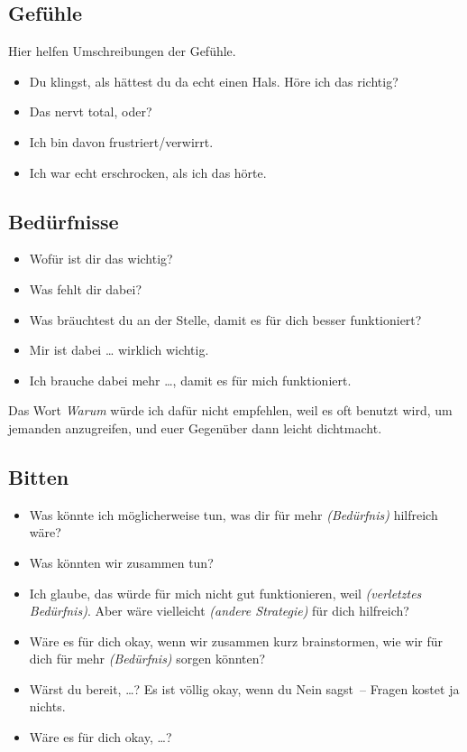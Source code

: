 \subsection{Gefühle}

Hier helfen Umschreibungen der Gefühle.

\begin{itemize}
  \item Du klingst, als hättest du da echt einen Hals. Höre ich das richtig?
  \item Das nervt total, oder?
  \item Ich bin davon frustriert/verwirrt.
  \item Ich war echt erschrocken, als ich das hörte.
\end{itemize}


\subsection{Bedürfnisse}

\begin{itemize}
  \item Wofür ist dir das wichtig?
  \item Was fehlt dir dabei?
  \item Was bräuchtest du an der Stelle, damit es für dich besser funktioniert?
  \item Mir ist dabei \ldots{} wirklich wichtig.
  \item Ich brauche dabei mehr \ldots, damit es für mich funktioniert.
\end{itemize}

Das Wort \emph{Warum} würde ich dafür nicht empfehlen, weil es oft benutzt wird, um jemanden anzugreifen, und euer Gegenüber dann leicht dichtmacht.


\subsection{Bitten}

\begin{itemize}
  \item Was könnte ich möglicherweise tun, was dir für mehr \emph{(Bedürfnis)} hilfreich wäre?
  \item Was könnten wir zusammen tun?
  \item Ich glaube, das würde für mich nicht gut funktionieren, weil \emph{(verletztes Bedürfnis)}. Aber wäre vielleicht \emph{(andere Strategie)} für dich hilfreich?
  \item Wäre es für dich okay, wenn wir zusammen kurz brainstormen, wie wir für dich für mehr \emph{(Bedürfnis)} sorgen könnten?
  \item Wärst du bereit, …? Es ist völlig okay, wenn du Nein sagst~-- Fragen kostet ja nichts.
  \item Wäre es für dich okay, …?
\end{itemize}

